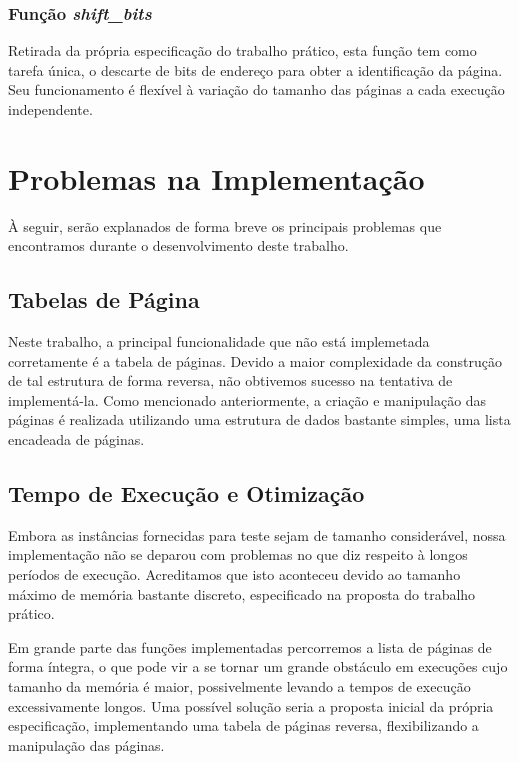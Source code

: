 \documentclass[a4paper, 12pt]{article}
\begin{document}
\subsubsection{Função \emph{shift\_bits}}

Retirada da própria especificação do trabalho prático, esta função tem como tarefa única, o descarte de bits de endereço para obter a identificação da página. Seu funcionamento é flexível à variação do tamanho das páginas a cada execução independente.

\section{Problemas na Implementação}

À seguir, serão explanados de forma breve os principais problemas que encontramos durante o desenvolvimento deste trabalho.

\subsection{Tabelas de Página}

Neste trabalho, a principal funcionalidade que não está implemetada corretamente é a tabela de páginas. Devido a maior complexidade da construção de tal estrutura de forma reversa, não obtivemos sucesso na tentativa de implementá-la. Como mencionado anteriormente, a criação e manipulação das páginas é realizada utilizando uma estrutura de dados bastante simples, uma lista encadeada de páginas.

\subsection{Tempo de Execução e Otimização}

Embora as instâncias fornecidas para teste sejam de tamanho considerável, nossa implementação não se deparou com problemas no que diz respeito à longos períodos de execução. Acreditamos que isto aconteceu devido ao tamanho máximo de memória bastante discreto, especificado na proposta do trabalho prático. 

Em grande parte das funções implementadas percorremos a lista de páginas de forma íntegra, o que pode vir a se tornar um grande obstáculo em execuções cujo tamanho da memória é maior, possivelmente levando a tempos de execução excessivamente longos. Uma possível solução seria a proposta inicial da própria especificação, implementando uma tabela de páginas reversa, flexibilizando a manipulação das páginas.
\end{document}
